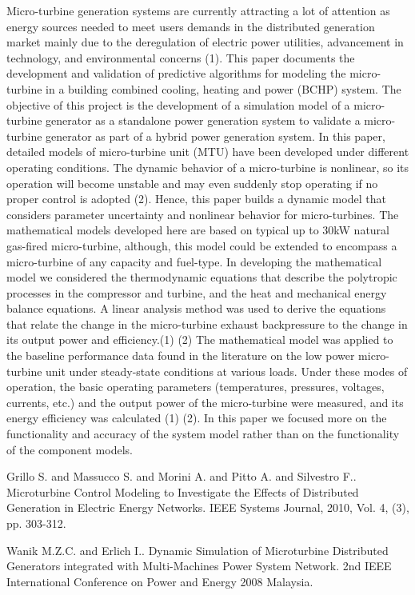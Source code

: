 Micro-turbine generation systems are currently attracting a lot of attention as energy sources needed to meet users demands in the distributed generation market mainly due to the deregulation of electric power utilities, advancement in technology, and environmental concerns (1). This paper documents the development and validation of predictive algorithms for modeling the micro-turbine in a building combined cooling, heating and power (BCHP) system. The objective of this project is the development of a simulation model of a micro-turbine generator as a standalone power generation system to validate a micro-turbine generator as part of a hybrid power generation system. In this paper, detailed models of micro-turbine unit (MTU) have been developed under different operating conditions. The dynamic behavior of a micro-turbine is nonlinear, so its operation will become unstable and may even suddenly stop operating if no proper control is adopted (2). Hence, this paper builds a dynamic model that considers parameter uncertainty and nonlinear behavior for micro-turbines. The mathematical models developed here are based on typical up to 30kW natural gas-fired micro-turbine, although, this model could be extended to encompass a micro-turbine of any capacity and fuel-type. In developing the mathematical model we considered the thermodynamic equations that describe the polytropic processes in the compressor and turbine, and the heat and mechanical energy balance equations. A linear analysis method was used to derive the equations that relate the change in the micro-turbine exhaust backpressure to the change in its output power and efficiency.(1) (2) The mathematical model was applied to the baseline performance data found in the literature on the low power micro-turbine unit under steady-state conditions at various loads. Under these modes of operation, the basic operating parameters (temperatures, pressures, voltages, currents, etc.) and the output power of the micro-turbine were measured, and its energy efficiency was calculated (1) (2). In this paper we focused more on the functionality and accuracy of the system model rather than on the functionality of the component models. 


\begin{thebibliography}{10}

{\sc Grillo S. and Massucco S. and Morini A. and Pitto A. and Silvestro F.}. {Microturbine Control Modeling to Investigate the Effects of Distributed Generation in Electric Energy Networks}. IEEE Systems Journal, 2010, Vol. 4, (3), pp. 303-312.



{\sc Wanik M.Z.C. and Erlich I.}. {Dynamic Simulation of Microturbine Distributed Generators integrated with Multi-Machines Power System Network}. 2nd IEEE International Conference on Power and Energy 2008 Malaysia.

\end{thebibliography}
